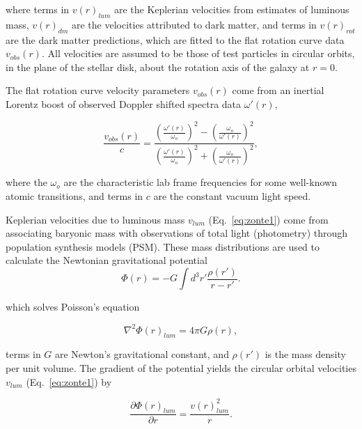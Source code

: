 \documentclass[reprint,%
 amsmath,amssymb,
 aps,
]{revtex4-1}
\begin{document}
  where terms in $v(r)_{lum}$ are the Keplerian velocities from estimates of   luminous mass,  $v(r)_{dm}$ are the velocities attributed to  dark matter, and 
  terms in $v(r)_{rot} $ are the dark matter  predictions,  which are fitted to the flat rotation curve data
  $v_{obs}(r)$. All velocities are assumed to be those of test particles in circular orbits, in the plane of the stellar disk,  about the rotation axis of the galaxy at  $r=0$. 
  

The flat rotation curve velocity parameters    $v_{obs}(r)$  come from an inertial 
 Lorentz boost  of  observed  Doppler shifted spectra data  $\omega'(r)$,  
   

 \begin{equation}
 \frac{v_{obs}(r) }{c}=
\frac{  \left( \frac{\omega'(r)}{\omega_o}\right)^2 -  \left( \frac{\omega_o}{\omega'(r)} \right)^2 }{  \left( \frac{\omega'(r)}{\omega_o}\right)^2  +  \left( \frac{\omega_o}{\omega'(r)}\right)^2 }, 
\label{eq:modelLumA}
\end{equation} 

  where the    $\omega_o$  are the
  characteristic lab  frame frequencies for some well-known atomic transitions, and terms in $c$ are  the constant vacuum light speed. 

  
  
  
  Keplerian velocities due to   luminous mass $v_{lum}$ (Eq.~\ref{eq:zonte1})
   come from associating  baryonic  mass with observations of total light  (photometry)  through  population synthesis models (PSM).  
  These mass distributions are    used to 
  calculate the Newtonian gravitational potential  
\begin{equation}
      \Phi(r)  = -G \int d^3r'  \frac{ \rho(r') }{r-r'}.
      \label{eq:Newt}
      \end{equation}
  
which solves Poisson's equation

\begin{equation}
\nabla^2 \Phi(r)_{lum}  = 4\pi G \rho(r),     
    \label{whatsgood}
\end{equation}

   terms in  $G$   are  Newton's   gravitational constant, and 
$\rho(r')$ is the mass density per unit volume. 
The gradient of the potential    yields the circular orbital velocities $v_{lum}$ (Eq.~\ref{eq:zonte1}) by

\begin{equation}
 \frac{\partial \Phi(r)_{lum}}{\partial r}    =\frac{v(r)_{lum}^2}{r}.  
    \label{zoochance1}
\end{equation}
\end{document}
